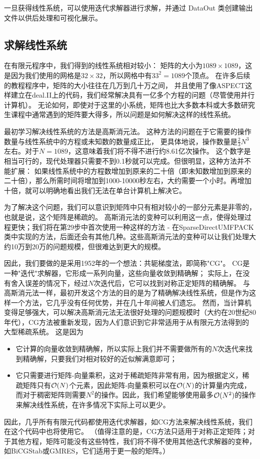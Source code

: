 \documentclass{ctexart}
\begin{document}
一旦获得线性系统，可以使用迭代求解器进行求解，并通过 DataOut 类创建输出文件以供后处理和可视化展示。

\subsection{求解线性系统}
在有限元程序中，我们得到的线性系统相对较小：
矩阵的大小为$1089 \times 1089$，这是因为我们使用的网格是$32 \times 32$，所以网格中有$33^2=1089$个顶点。
在许多后续的教程程序中，矩阵的大小往往在几万到几十万之间，
并且使用了像ASPECT这样建立在deal.II上的代码，我们经常解决具有一亿多个方程的问题（尽管使用并行计算机）。
无论如何，即使对于这里的小系统，矩阵也比大多数本科或大多数研究生课程中通常遇到的矩阵要大得多，所以问题是如何解决这样的线性系统。

最初学习解决线性系统的方法是高斯消元法。
这种方法的问题在于它需要的操作数量与线性系统中的方程或未知数的数量成正比，
更具体地说，操作数量是$ \frac{2}{3} N^3$左右。对于$N=1089$，这意味着我们将不得不进行约8.61亿次操作。
这个数字是相当可行的，现代处理器只需要不到0.1秒就可以完成。但很明显，这种方法并不能扩展：
如果线性系统中的方程数增加到原来的二十倍（即未知数增加到原来的二十倍），那么所需时间将增加到1000-10000秒左右，大约需要一个小时。再增加十倍，就可以明确地看出我们无法在单台计算机上解决它。

为了解决这个问题，我们可以意识到矩阵中只有相对较小的一部分元素是非零的，也就是说，这个矩阵是稀疏的。
高斯消元法的变种可以利用这一点，使得处理过程更快；我们将在第29步中首次使用一种这样的方法 - 在SparseDirectUMFPACK类中实现的方法，后面还会有其他几种。这些高斯消元法的变种可以让我们处理大约10万到20万的问题规模，但很难达到更大的规模。

因此，我们要做的是采用1952年的一个想法：共轭梯度法，即简称"CG"。
CG是一种"迭代"求解器，它形成一系列向量，这些向量收敛到精确解；
实际上，在没有舍入误差的情况下，经过$N$次迭代后，它可以找到对称正定矩阵的精确解。
与高斯消元法一样，最初开发这个方法的目的是为了精确解决线性系统，但是作为这样一个方法，它几乎没有任何优势，并在几十年间被人们遗忘。
然而，当计算机变得足够强大，可以解决高斯消元法无法很好处理的问题规模时（大约在20世纪80年代），CG方法被重新发现，因为人们意识到它非常适用于从有限元方法得到的大型稀疏系统。
这是因为 
\begin{itemize}
    \item 它计算的向量收敛到精确解，所以实际上我们并不需要做所有的$N$次迭代来找到精确解，只要我们对相对较好的近似解满意即可；
    \item 它只需要进行矩阵-向量乘积，这对于稀疏矩阵非常有用，因为根据定义，稀疏矩阵只有${\cal O}(N)$个元素，因此矩阵-向量乘积可以在${\cal O}(N)$的计算量内完成，而对于稠密矩阵则需要$N^2$的操作。因此，我们希望能够使用最多${\cal O}(N^2)$的操作来解决线性系统，在许多情况下实际上可以更少。
\end{itemize}
因此，几乎所有有限元代码都使用迭代求解器，如CG方法来解决线性系统，我们在这个代码中也将使用它。
（值得注意的是，CG方法只适用于对称正定矩阵；对于其他方程，矩阵可能没有这些特性，我们将不得不使用其他迭代求解器的变种，如BiCGStab或GMRES，它们适用于更一般的矩阵。）
\end{document}
